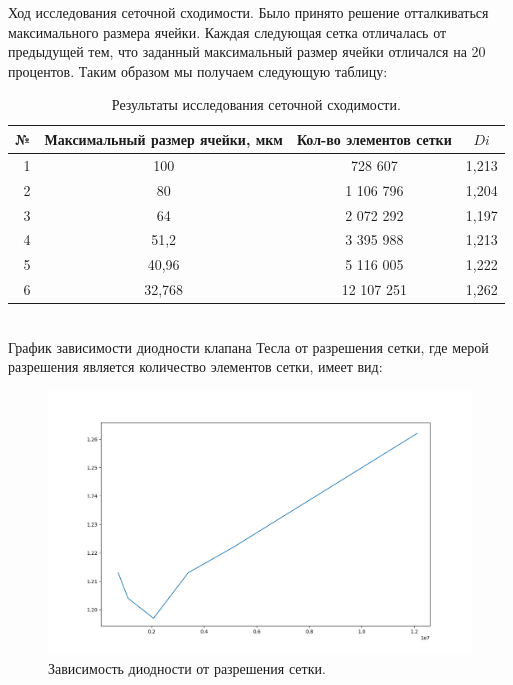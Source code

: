 \documentclass[14pt,a4paper]{article}
\begin{document}
        Ход исследования сеточной сходимости. Было принято решение отталкиваться максимального размера ячейки. Каждая следующая сетка отличалась от предыдущей тем, что заданный максимальный размер ячейки отличался на 20 процентов. Таким образом мы получаем следующую таблицу: 
        \\
        \begin{table}[!htb]
            \begin{center}
                \caption{Результаты исследования сеточной сходимости.}
                \begin{tabular}{rccc}                 
                    \hline
                    №      & Максимальный размер ячейки, мкм & Кол-во элементов сетки  & $Di$ \\
                    \hline
                    \hline
                    1	& 100		& 728 607		& 1,213		\\
                    2	& 80		& 1 106 796	 	& 1,204		\\
                    3   & 64		& 2 072 292		& 1,197		\\
                    4	& 51,2		& 3 395 988		& 1,213		\\
                    5	& 40,96		& 5 116 005		& 1,222		\\
                    6	& 32,768	& 12 107 251	& 1,262		\\
                    \hline                   
                \end{tabular}
                \label{tab:tab1} 
            \end{center}
        \end{table}
        \\
        
        График зависимости диодности клапана Тесла от разрешения сетки, где мерой разрешения является количество элементов сетки, имеет вид:
        
        \begin{figure}[H]
            \centering
            \includegraphics[width = 1\linewidth]{graphDi1}
            \caption{Зависимость диодности от разрешения сетки.}
            \label{fig:graphDi1}
        \end{figure}
                                    
\end{document}
